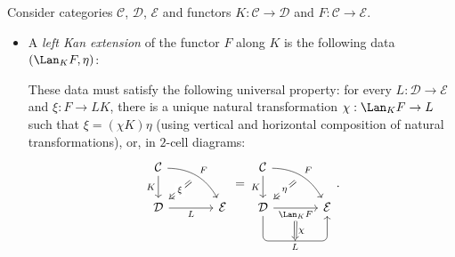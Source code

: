 \begin{definition}[D.\ Kan]\label{def:Kan-extension}
	Consider categories $\mathcal{C}$, $\mathcal{D}$, $\mathcal{E}$ and
	functors $K: \mathcal{C} \to \mathcal{D}$ and
	$F: \mathcal{C} \to \mathcal{E}$.
	\begin{itemize}
		\item A \emph{left Kan extension} of the functor $F$ along $K$ is the
		following data $(\Lan_K F, \eta)$:
		These data must satisfy the following universal property: for every
		$L: \mathcal{D} \to \mathcal{E}$ and $\xi: F \to LK$, there is a unique
		natural transformation $\chi: \Lan_K F \to L$ such that
		$\xi = (\chi K) \eta$ (using vertical and horizontal composition of
		natural transformations), or, in $2$-cell diagrams:
		\[\begin{tikzcd}[column sep=large]
			\mathcal{C} \arrow[d, "K"'] \arrow[rd, bend left, "F", ""' {name=F}] & \\
			\mathcal{D} \arrow[r, "L"'] \arrow[Rightarrow, from=F, "\xi" description] & \mathcal{E}
		\end{tikzcd} = \begin{tikzcd}[column sep=large]
			\mathcal{C} \arrow[d, "K"'] \arrow[rd, bend left, "F", ""' {name=F}] & \\
			\mathcal{D} \arrow[r, "{\Lan_K F}"' name=A] \arrow[Rightarrow, from=F, "\eta" description] \arrow[r, "L"{below, name=B}, rounded corners, to path={-- ([yshift=-2em]\tikztostart.south) -- ([yshift=-2em] \tikztotarget.south) [midway]\tikztonodes -- (\tikztotarget) }] & \mathcal{E} \arrow[Rightarrow, from=A, to=B, "\chi"]
		\end{tikzcd}. \]


\end{itemize}
\end{definition}
